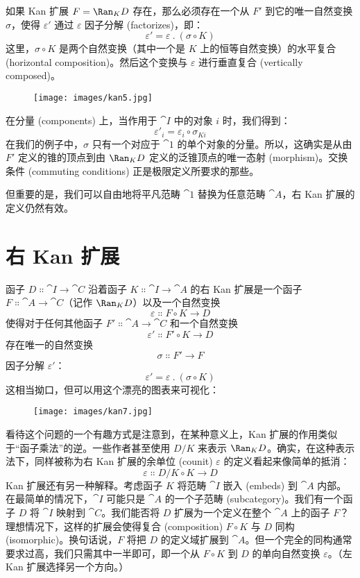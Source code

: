 \noindent
如果 Kan 扩展 $F = \Ran_{K}D$ 存在，那么必须存在一个从 $F'$ 到它的唯一自然变换 $\sigma$，使得 $\varepsilon'$ 通过 $\varepsilon$ 因子分解 (factorizes)，即：
\[\varepsilon' = \varepsilon\ .\ (\sigma \circ K)\]
这里，$\sigma \circ K$ 是两个自然变换（其中一个是 $K$ 上的恒等自然变换）的水平复合 (horizontal composition)。然后这个变换与 $\varepsilon$ 进行垂直复合 (vertically composed)。

\begin{figure}[H]
  \centering
  \texttt{[image: images/kan5.jpg]}
\end{figure}

\noindent
在分量 (components) 上，当作用于 $\cat{I}$ 中的对象 $i$ 时，我们得到：
\[\varepsilon'_i = \varepsilon_i \circ \sigma_{K i}\]
在我们的例子中，$\sigma$ 只有一个对应于 $\cat{1}$ 的单个对象的分量。所以，这确实是从由 $F'$ 定义的锥的顶点到由 $\Ran_{K}D$ 定义的泛锥顶点的唯一态射 (morphism)。交换条件 (commuting conditions) 正是极限定义所要求的那些。

但重要的是，我们可以自由地将平凡范畴 $\cat{1}$ 替换为任意范畴 $\cat{A}$，右 Kan 扩展的定义仍然有效。

\section{右 Kan 扩展}

函子 $D \Colon \cat{I} \to \cat{C}$ 沿着函子 $K \Colon \cat{I} \to \cat{A}$ 的右 Kan 扩展是一个函子 $F \Colon \cat{A} \to \cat{C}$（记作 $\Ran_{K}D$）以及一个自然变换
\[\varepsilon \Colon F \circ K \to D\]
使得对于任何其他函子 $F' \Colon \cat{A} \to \cat{C}$ 和一个自然变换
\[\varepsilon' \Colon F' \circ K \to D\]
存在唯一的自然变换
\[\sigma \Colon F' \to F\]
因子分解 $\varepsilon'$：
\[\varepsilon' = \varepsilon\ .\ (\sigma \circ K)\]
这相当拗口，但可以用这个漂亮的图表来可视化：

\begin{figure}[H]
  \centering
  \texttt{[image: images/kan7.jpg]}
\end{figure}

\noindent
看待这个问题的一个有趣方式是注意到，在某种意义上，Kan 扩展的作用类似于“函子乘法”的逆。一些作者甚至使用 $D/K$ 来表示 $\Ran_{K}D$。确实，在这种表示法下，同样被称为右 Kan 扩展的余单位 (counit) $\varepsilon$ 的定义看起来像简单的抵消：
\[\varepsilon \Colon D/K \circ K \to D\]
Kan 扩展还有另一种解释。考虑函子 $K$ 将范畴 $\cat{I}$ 嵌入 (embeds) 到 $\cat{A}$ 内部。在最简单的情况下，$\cat{I}$ 可能只是 $\cat{A}$ 的一个子范畴 (subcategory)。我们有一个函子 $D$ 将 $\cat{I}$ 映射到 $\cat{C}$。我们能否将 $D$ 扩展为一个定义在整个 $\cat{A}$ 上的函子 $F$？理想情况下，这样的扩展会使得复合 (composition) $F \circ K$ 与 $D$ 同构 (isomorphic)。换句话说，$F$ 将把 $D$ 的定义域扩展到 $\cat{A}$。但一个完全的同构通常要求过高，我们只需其中一半即可，即一个从 $F \circ K$ 到 $D$ 的单向自然变换 $\varepsilon$。（左 Kan 扩展选择另一个方向。）

